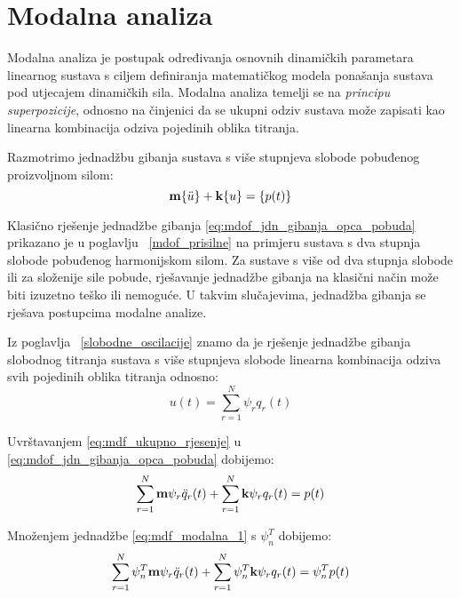\section{Modalna analiza}\label{sec:modalnaAnalizaNepriguseniSustav}
Modalna analiza je postupak određivanja osnovnih dinamičkih parametara linearnog
sustava s ciljem definiranja matematičkog modela ponašanja sustava pod utjecajem
dinamičkih sila. Modalna analiza temelji se na \textit{principu superpozicije},
odnosno na činjenici da se ukupni odziv sustava može zapisati kao linearna
kombinacija odziva pojedinih oblika titranja.
\par

Razmotrimo jednadžbu gibanja sustava s više stupnjeva slobode pobuđenog proizvoljnom
silom:
\begin{equation}\label{eq:mdof_jdn_gibanja_opca_pobuda}
    \mm\vtor{u}{:} + \kk\vtor{u}{} = \vtor{p(t)}{}
\end{equation}

Klasično rješenje jednadžbe gibanja \eqref{eq:mdof_jdn_gibanja_opca_pobuda}
prikazano je u poglavlju ~\ref{mdof_prisilne} na primjeru sustava s dva stupnja 
slobode pobuđenog harmonijskom silom. Za sustave s više od dva stupnja slobode ili
za složenije sile pobude, rješavanje jednadžbe gibanja na klasični način može biti
izuzetno teško ili nemoguće. U takvim slučajevima, jednadžba gibanja se rješava
postupcima modalne analize.
\par

Iz poglavlja ~\ref{slobodne_oscilacije} znamo da je rješenje jednadžbe gibanja
slobodnog titranja sustava s više stupnjeva slobode linearna kombinacija
odziva svih pojedinih oblika titranja odnosno:
\begin{equation}\label{eq:mdf_ukupno_rjesenje}
    u(t)=\sum_{r=1}^N\psi_rq_r(t)
\end{equation}

Uvrštavanjem \eqref{eq:mdf_ukupno_rjesenje} u \eqref{eq:mdof_jdn_gibanja_opca_pobuda} 
dobijemo:
\begin{equation}\label{eq:mdf_modalna_1}
    \sum_{r=1}^N\mathbf{m}\psi_r\ddot{q}_r(t) + \sum_{r=1}^N\mathbf{k}\psi_rq_r(t)=p(t)
\end{equation}

Množenjem jednadžbe \eqref{eq:mdf_modalna_1} s $\psi_n^T$ dobijemo:
\begin{equation}\label{eq:mdf_modalna_2}
    \sum_{r=1}^N\psi_n^T\mathbf{m}\psi_r\ddot{q}_r(t)+\sum_{r=1}^N\psi_n^T\mathbf{k}\psi_rq_r(t)=\psi_n^Tp(t)
\end{equation}

